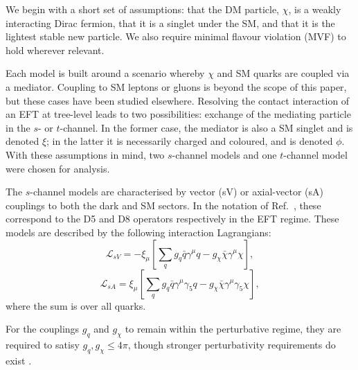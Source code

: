 We begin with a short set of assumptions: that the DM particle, $\chi$, is a weakly interacting Dirac fermion, that it is a singlet under the SM, and that it is the lightest stable new particle. We also require minimal flavour violation (MVF) to hold wherever relevant.

Each model is built around a scenario whereby $\chi$ and SM quarks are coupled via a mediator. Coupling to SM leptons \cite{} or gluons \cite{} is beyond the scope of this paper, but these cases have been studied elsewhere. Resolving the contact interaction of an EFT at tree-level leads to two possibilities: exchange of the mediating particle in the $s$- or $t$-channel. In the former case, the mediator is also a SM singlet and is denoted $\xi$; in the latter it is necessarily charged and coloured, and is denoted $\phi$. With these assumptions in mind, two $s$-channel models and one $t$-channel model were chosen for analysis.

The $s$-channel models are characterised by vector (sV) or axial-vector (sA) couplings to both the dark and SM sectors. In the notation of Ref.~\cite{DMCons2}, these correspond to the D5 and D8 operators respectively in the EFT regime. These models are described by the following interaction Lagrangians:
\begin{equation}
\label{L_int_sV}
\mathcal{L}_{sV} = - \xi_{\mu}\left[ \sum\limits_{q} g_{q}\bar{q}\gamma^{\mu}q - g_{\chi}\bar{\chi}\gamma^{\mu}\chi\right],
\end{equation}
\begin{equation}
\label{L_int_sA}
\mathcal{L}_{sA} =  \xi_{\mu}\left[\sum\limits_{q} g_{q}\bar{q}\gamma^{\mu}\gamma_{5}q - g_{\chi}\bar{\chi}\gamma^{\mu}\gamma_{5}\chi\right],
\end{equation}
where the sum is over all quarks.

For the couplings $g_q$ and $g_{\chi}$ to remain within the perturbative regime, they are required to satisy $g_{q},g_{\chi} \leq 4\pi$, though stronger perturbativity requirements do exist \cite{ValidEFT}.

